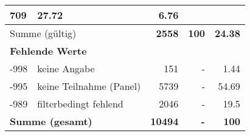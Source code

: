 \begin{longtable}{lXrrr}
       \num{709} &
       \num[round-mode=places,round-precision=2]{27.72} &
         \num[round-mode=places,round-precision=2]{6.76} \\
     \midrule
     \multicolumn{2}{l}{Summe (gültig)} &
       \textbf{\num{2558}} &
     \textbf{\num{100}} &
       \textbf{\num[round-mode=places,round-precision=2]{24.38}} \\
     \multicolumn{5}{l}{\textbf{Fehlende Werte}}\\
       -998 &
       keine Angabe &
         \num{151} &
        - &
         \num[round-mode=places,round-precision=2]{1.44} \\
       -995 &
       keine Teilnahme (Panel) &
         \num{5739} &
        - &
         \num[round-mode=places,round-precision=2]{54.69} \\
       -989 &
       filterbedingt fehlend &
         \num{2046} &
        - &
         \num[round-mode=places,round-precision=2]{19.5} \\
     \midrule
     \multicolumn{2}{l}{\textbf{Summe (gesamt)}} &
          \textbf{\num{10494}} &
        \textbf{-} &
        \textbf{\num{100}} \\
     \bottomrule
     \end{longtable}
     
